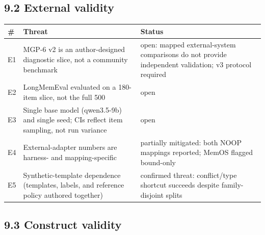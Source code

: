 \subsection{9.2 External validity}\label{external-validity}

{\def\LTcaptype{none} %
\begin{longtable}[]{@{}
  >{\raggedright\arraybackslash}p{}
  >{\raggedright\arraybackslash}p{}
  >{\raggedright\arraybackslash}p{}@{}}
\toprule\noalign{}
\begin{minipage}[b]{\linewidth}\raggedright
\textbf{\#}
\end{minipage} & \begin{minipage}[b]{\linewidth}\centering
\textbf{Threat}
\end{minipage} & \begin{minipage}[b]{\linewidth}\centering
\textbf{Status}
\end{minipage} \\
\midrule\noalign{}
\endhead
\bottomrule\noalign{}
\endlastfoot
E1 & MGP-6 v2 is an author-designed diagnostic slice, not a community
benchmark & open: mapped external-system comparisons do not provide
independent validation; v3 protocol required \\
E2 & LongMemEval evaluated on a 180-item slice, not the full 500 &
open \\
E3 & Single base model (qwen3.5-9b) and single seed; CIs reflect item
sampling, not run variance & open \\
E4 & External-adapter numbers are harness- and mapping-specific &
partially mitigated: both NOOP mappings reported; MemOS flagged
bound-only \\
E5 & Synthetic-template dependence (templates, labels, and reference
policy authored together) & confirmed threat: conflict/type shortcut
succeeds despite family-disjoint splits \\
\end{longtable}
}

\subsection{9.3 Construct validity}\label{construct-validity}

